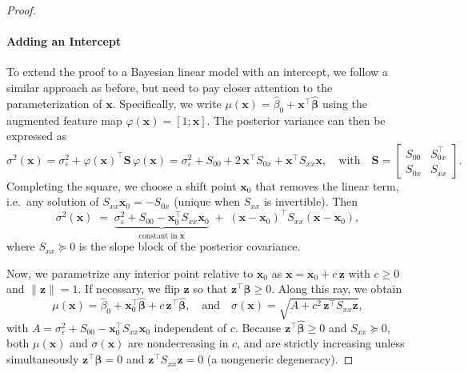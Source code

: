 \documentclass[twoside]{article}
\theoremstyle{plain}
\theoremstyle{definition}
\begin{document}
\begin{proof}
    \paragraph{Adding an Intercept} To extend the proof to a Bayesian linear model with an intercept, we follow a similar approach as before, but need to pay closer attention to the parameterization of $\mathbf{x}$. Specifically, we write $\mu(\mathbf{x}) = \hat{\beta}_0 + \mathbf{x}^\top \hat{\bm{\beta}}$ using the augmented feature map $\varphi(\mathbf{x}) = [1;\mathbf{x}]$. The posterior variance can then be expressed as 
    \begin{equation*}
        \sigma^2(\mathbf{x}) = \sigma_\varepsilon^2 + \varphi(\mathbf{x})^\top \mathbf{S}\,\varphi(\mathbf{x}) = \sigma_\varepsilon^2 + S_{00} + 2\,\mathbf{x}^\top S_{0x} + \mathbf{x}^\top S_{xx}\mathbf{x}, \quad \text{with} \quad \mathbf{S}=\begin{bmatrix} S_{00} & S_{0x}^\top \\ S_{0x} & S_{xx} \end{bmatrix}.
    \end{equation*}
    Completing the square, we choose a shift point $\mathbf{x}_0$ that removes the linear term, i.e.\ any solution of $S_{xx}\mathbf{x}_0 = -S_{0x}$ (unique when $S_{xx}$ is invertible). Then
    \begin{equation*}
        \sigma^2(\mathbf{x}) \;=\; \underbrace{\sigma_\varepsilon^2 + S_{00} - \mathbf{x}_0^\top S_{xx}\mathbf{x}_0}_{\text{constant in }\mathbf{x}} \;+\; (\mathbf{x}-\mathbf{x}_0)^\top S_{xx}(\mathbf{x}-\mathbf{x}_0),
    \end{equation*}
    where $S_{xx}\succeq 0$ is the slope block of the posterior covariance.
    
    Now, we parametrize any interior point relative to $\mathbf{x}_0$ as $\mathbf{x}=\mathbf{x}_0+c\,\mathbf{z}$ with $c\ge 0$ and $\|\mathbf{z}\|=1$. If necessary, we flip $\mathbf{z}$ so that $\mathbf{z}^\top \hat{\bm{\beta}}\ge 0$. Along this ray, we obtain
    \begin{equation*}
        \mu(\mathbf{x}) = \hat{\beta}_0 + \mathbf{x}_0^\top\hat{\bm{\beta}} + c\,\mathbf{z}^\top\hat{\bm{\beta}},
        \quad \text{and} \quad
        \sigma(\mathbf{x}) = \sqrt{A + c^2\,\mathbf{z}^\top S_{xx}\mathbf{z}},
    \end{equation*}
    with $A=\sigma_\varepsilon^2 + S_{00} - \mathbf{x}_0^\top S_{xx}\mathbf{x}_0$ independent of $c$. Because $\mathbf{z}^\top\hat{\bm{\beta}}\ge 0$ and $S_{xx}\succeq 0$, both $\mu(\mathbf{x})$ and $\sigma(\mathbf{x})$ are nondecreasing in $c$, and are strictly increasing unless simultaneously $\mathbf{z}^\top\bm{\beta}=0$ and $\mathbf{z}^\top S_{xx}\mathbf{z}=0$ (a nongeneric degeneracy).
\end{proof}
\end{document}
